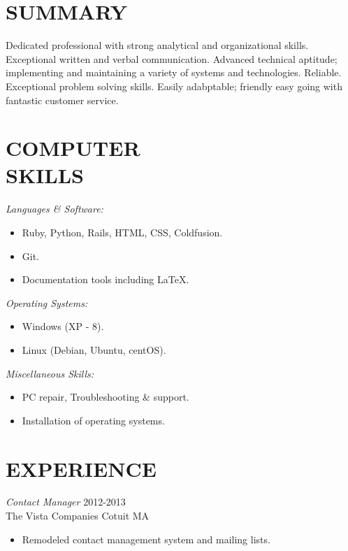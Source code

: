 \documentclass[line,margin]{res}
\begin{document}
\address{256 Stoney Cliff rd. Centerville, MA 02632}
\address{p.johnson125@gmail.com}
\address{(508) 776-7664}
 
\begin{resume}
 
\section{SUMMARY} Dedicated professional with strong analytical and organizational skills. Exceptional written and verbal communication. Advanced technical aptitude; implementing and maintaining a variety of systems and technologies. Reliable. Exceptional problem solving skills. Easily adabptable; friendly easy going with fantastic customer service. \\ 

 
\section{COMPUTER \\ SKILLS}
                {\sl Languages \& Software:}
                    \begin{itemize} \itemsep -2pt
                        \item   Ruby, Python, Rails, HTML, CSS, Coldfusion.
                        \item   Git.
                        \item  Documentation tools including \LaTeX.
                    \end{itemize}

                {\sl Operating Systems:}
                     \begin{itemize} \itemsep -2pt 
                        \item   Windows (XP - 8).
                        \item   Linux (Debian, Ubuntu, centOS).
                     \end{itemize}

                {\sl Miscellaneous Skills:}
                    \begin{itemize} \itemsep -2pt
                      \item   PC repair, Troubleshooting \& support.
                      \item   Installation of operating systems.
                    \end{itemize}
 
\section{EXPERIENCE} {\sl Contact Manager} \hfill 2012-2013 \\
                The Vista Companies Cotuit MA
                 \begin{itemize}  \itemsep -2pt %
                  \item   Remodeled contact management system and mailing lists.
                   

\end{itemize}
\end{resume}
\end{document}
